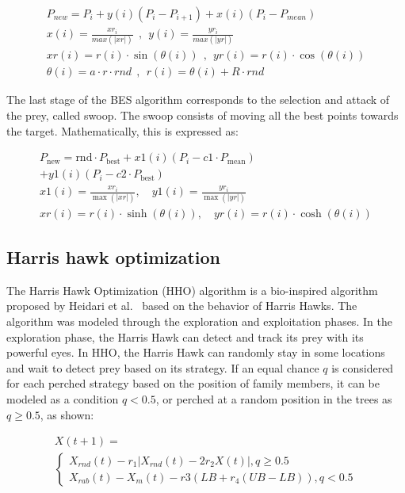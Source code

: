 \documentclass{elsarticle}
\begin{document}
\begin{equation}
\begin{gathered}
P_{new}=P_{i}+y(i)(P_{i}-P_{i+1})+x(i)(P_{i}-P_{mean}) \\
x(i)= \frac{xr_{i}}{max(\lvert xr \rvert)} ~\ , ~\ y(i)= \frac{yr_{i}}{max(\lvert yr \rvert)} \\
xr(i)=r(i)\cdot \sin (\theta(i)) ~\ , ~\ yr(i)=r(i)\cdot \cos (\theta(i)) \\
\theta(i)=a\cdot r\cdot rnd ~\ , ~\ r(i)=\theta(i)+R \cdot rnd 
\end{gathered}
\label{eq12}
\end{equation}

The last stage of the BES algorithm corresponds to the selection and attack of the prey, called swoop. The swoop consists of moving all the best points towards the target. Mathematically, this is expressed as:

\begin{equation}
\begin{gathered}
P_{\text{new}} = \text{rnd} \cdot P_{\text{best}} + x1(i)(P_{i}-c1 \cdot P_{\text{mean}}) \\
+ y1(i)(P_{i}-c2 \cdot P_{\text{best}}) \\
x1(i) = \frac{xr_{i}}{\max(\lvert xr \rvert)}, \quad y1(i) = \frac{yr_{i}}{\max(\lvert yr \rvert)} \\
xr(i) = r(i) \cdot \sinh(\theta(i)), \quad yr(i) = r(i) \cdot \cosh(\theta(i))
\end{gathered}
\end{equation}

\subsection{Harris hawk optimization}

The Harris Hawk Optimization (HHO) algorithm is a bio-inspired algorithm proposed by Heidari et al.~\cite{Heidari2019} based on the behavior of Harris Hawks. The algorithm was modeled through the exploration and exploitation phases. In the exploration phase, the Harris Hawk can detect and track its prey with its powerful eyes. In HHO, the Harris Hawk can randomly stay in some locations and wait to detect prey based on its strategy. If an equal chance $q$ is considered for each perched strategy based on the position of family members, it can be modeled as a condition $q<0.5$, or perched at a random position in the trees as $q\geq 0.5$, as shown:

\begin{equation}
\begin{gathered}
X(t+1)= \\
\begin{cases}
  X_{rnd}(t) - r_1 |X_{rnd}(t) -2 r_2 X(t)| , q \geq 0.5 \\
  X_{rab}(t) - X_m(t) - r3(LB + r_4 (UB-LB)) , q < 0.5
\end{cases}
\end{gathered}
\end{equation}
\end{document}

